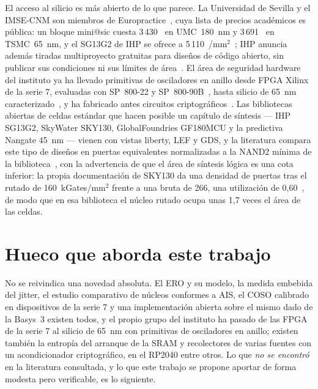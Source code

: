 El acceso al silicio es más abierto de lo que parece. La Universidad de
Sevilla y el IMSE-CNM son miembros de Europractice~\cite{europractice_memberlist},
cuya lista de precios académicos es pública: un bloque mini@sic cuesta
3\,430~\texteuro{} en UMC~180~nm y 3\,691~\texteuro{} en TSMC~65~nm, y el
SG13G2 de IHP se ofrece a
5\,110~\texteuro{}/mm$^2$~\cite{europractice_prices2026,
europractice_minisic}; IHP anuncia además tiradas multiproyecto gratuitas
para diseños de código abierto, sin publicar sus condiciones ni sus
límites de área~\cite{ihp_openpdk}. El área de seguridad hardware del
instituto ya ha llevado
primitivas de osciladores en anillo desde FPGA Xilinx de la serie 7,
evaluadas con SP~800-22 y
SP~800-90B~\cite{rojas2022trngcapability}, hasta silicio de 65~nm
caracterizado~\cite{imse_area_hwsec,
martinez2022efficientropuf, ortega2024vlsi65nm, ortega2026ropuf65nm}, y
ha fabricado antes circuitos criptográficos~\cite{mora2020trivium}. Las
bibliotecas abiertas de celdas estándar que hacen posible un capítulo de
síntesis --- IHP SG13G2, SkyWater SKY130, GlobalFoundries GF180MCU y la
predictiva Nangate 45~nm --- vienen con vistas liberty, LEF y GDS, y la
literatura compara este tipo de diseños en puertas equivalentes
normalizadas a la NAND2 mínima de la biblioteca~\cite{ihp_openpdk_repo, skywater_pdk_cells, gf180mcu_pdk,
nangate45}, con la advertencia de que el área de síntesis
lógica es una cota inferior: la propia documentación de SKY130 da una
densidad de puertas tras el rutado de 160~kGates/mm$^2$ frente a una
bruta de 266, una utilización de 0,60~\cite{skywater_pdk_cells}, de modo
que en esa biblioteca el núcleo rutado ocupa unas 1,7 veces el área de
las celdas.

\section{Hueco que aborda este trabajo}
\label{sec:gap}

No se reivindica una novedad absoluta. El ERO y su modelo, la medida
embebida del jitter, el estudio comparativo de núcleos conformes a AIS,
el COSO calibrado en dispositivos de la serie 7 y una implementación
abierta sobre el mismo dado de la Basys~3 existen todos, y el propio
grupo del instituto ha pasado de las FPGA de la serie 7 al silicio de
65~nm con primitivas de osciladores en anillo; existen también la
entropía del arranque de la SRAM y recolectores de varias fuentes con un
acondicionador criptográfico, en el RP2040 entre otros. Lo que \emph{no se
encontró} en la literatura consultada, y lo que este trabajo se propone
aportar de forma modesta pero verificable, es lo siguiente.


